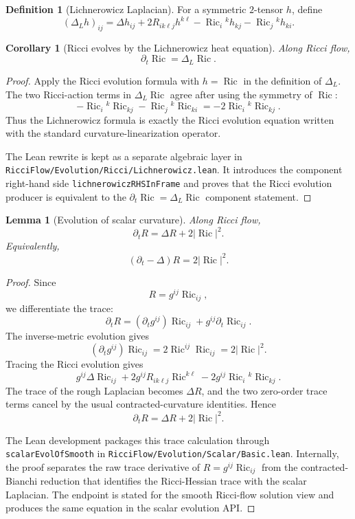 \documentclass[11pt]{article}
\theoremstyle{plain}
\newtheorem{lemma}[theorem]{Lemma}
\newtheorem{corollary}[theorem]{Corollary}
\theoremstyle{definition}
\newtheorem{definition}[theorem]{Definition}
\theoremstyle{remark}
\newcommand{\Ric}{\operatorname{Ric}}
\newcommand{\norm}[1]{\left|#1\right|}
\newcommand{\leanref}[1]{\nolinkurl{#1}}
\newcommand{\leanfile}[1]{\nolinkurl{#1}}
\newcommand{\rffile}[1]{\leanfile{#1}}
\begin{document}
\begin{definition}[Lichnerowicz Laplacian]
\label{def:lichnerowicz-laplacian}
For a symmetric $2$-tensor $h$, define
\[
(\Delta_Lh)_{ij}
=
\Delta h_{ij}
+2R_{ik\ell j}h^{k\ell}
-\Ric_i{}^kh_{kj}
-\Ric_j{}^kh_{ki}.
\]
\end{definition}

\begin{corollary}[Ricci evolves by the Lichnerowicz heat equation]
\label{cor:ricci-lichnerowicz}
Along Ricci flow,
\[
\partial_t\Ric=\Delta_L\Ric.
\]
\end{corollary}

\begin{proof}
Apply the Ricci evolution formula with \(h=\Ric\) in the definition of
\(\Delta_L\).  The two Ricci-action terms in \(\Delta_L\Ric\) agree after using
the symmetry of \(\Ric\):
\[
  -\Ric_i{}^k\Ric_{kj}
  -
  \Ric_j{}^k\Ric_{ki}
  =
  -2\Ric_i{}^k\Ric_{kj}.
\]
Thus the Lichnerowicz formula is exactly the Ricci evolution equation written
with the standard curvature-linearization operator.

The Lean rewrite is kept as a separate algebraic layer in
\rffile{RicciFlow/Evolution/Ricci/Lichnerowicz.lean}.  It introduces the
component right-hand side \leanref{lichnerowiczRHSInFrame} and proves that the
Ricci evolution producer is equivalent to the \(\partial_t\Ric=\Delta_L\Ric\)
component statement.
\end{proof}

\begin{lemma}[Evolution of scalar curvature]
\label{lem:evol-scalar}
Along Ricci flow,
\[
\partial_tR=\Delta R+2\norm{\Ric}^2.
\]
Equivalently,
\[
(\partial_t-\Delta)R=2\norm{\Ric}^2.
\]
\end{lemma}

\begin{proof}
Since
\[
  R=g^{ij}\Ric_{ij},
\]
we differentiate the trace:
\[
  \partial_tR
  =
  (\partial_tg^{ij})\Ric_{ij}
  +
  g^{ij}\partial_t\Ric_{ij}.
\]
The inverse-metric evolution gives
\[
  (\partial_tg^{ij})\Ric_{ij}
  =
  2\Ric^{ij}\Ric_{ij}
  =
  2\norm{\Ric}^2.
\]
Tracing the Ricci evolution gives
\[
  g^{ij}\Delta\Ric_{ij}
  +
  2g^{ij}R_{ik\ell j}\Ric^{k\ell}
  -
  2g^{ij}\Ric_i{}^k\Ric_{kj}.
\]
The trace of the rough Laplacian becomes \(\Delta R\), and the two zero-order
trace terms cancel by the usual contracted-curvature identities.  Hence
\[
  \partial_tR=\Delta R+2\norm{\Ric}^2.
\]

The Lean development packages this trace calculation through
\leanref{scalarEvolOfSmooth} in \rffile{RicciFlow/Evolution/Scalar/Basic.lean}.
Internally, the proof separates the raw trace derivative of \(R=g^{ij}\Ric_{ij}\)
from the contracted-Bianchi reduction that identifies the Ricci-Hessian trace
with the scalar Laplacian.  The endpoint is stated for the smooth Ricci-flow
solution view and produces the same equation in the scalar evolution API.
\end{proof}
\end{document}
